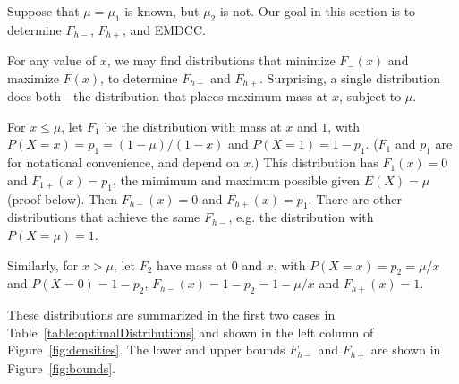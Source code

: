 \documentclass{article}
\newcommand{\Fmin}{F_{h-}}
\newcommand{\Fmax}{F_{h+}}
\begin{document}
Suppose that $\mu = \mu_1$ is known, but $\mu_2$ is not.
Our goal in this section is to determine $\Fmin$, $\Fmax$, and
EMDCC.

For any value of $x$, we may find distributions that minimize
$F_{-}(x)$ and maximize $F(x)$, to determine $\Fmin$ and $\Fmax$.
Surprising, a single distribution does both---the distribution that
places maximum mass at $x$, subject to $\mu$.

For $x \le \mu$, let $F_1$ be the distribution
with mass at $x$ and $1$,
with $P(X = x) = p_1 = (1-\mu)/(1-x)$ and $P(X = 1) = 1-p_1$.
($F_1$ and $p_1$ are for notational convenience, and depend on $x$.)
This distribution has $F_1(x) = 0$ and $F_{1+}(x) = p_1$, the mimimum
and maximum possible given $E(X) = \mu$ (proof below).
Then $\Fmin(x) = 0$ and $\Fmax(x) = p_1$.
There are other distributions that achieve the same $\Fmin$,
e.g. the distribution with $P(X=\mu) = 1$.

Similarly, for $x > \mu$, let $F_2$ have mass at $0$ and $x$,
with $P(X = x) = p_2 = \mu/x$ and $P(X=0) = 1-p_2$,
$\Fmin(x) = 1-p_2 = 1 - \mu/x$ and $\Fmax(x) = 1$.

These distributions are summarized in the first two cases in
Table~\ref{table:optimalDistributions}
and shown in the left column of
Figure~\ref{fig:densities}.
The lower and upper bounds $\Fmin$ and $\Fmax$ are shown
in Figure~\ref{fig:bounds}.
\end{document}
